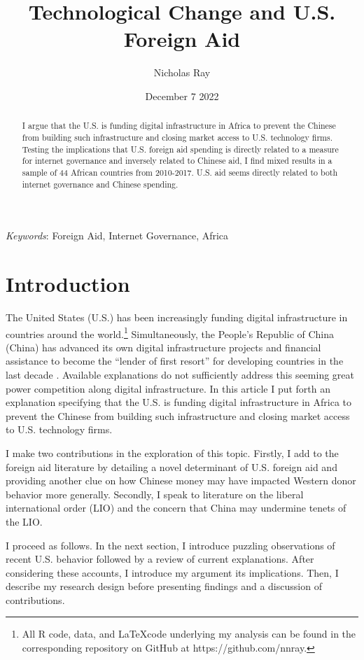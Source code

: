 \documentclass[12pt]{article}
\title{\vspace{-2.75cm}Technological Change and U.S. Foreign Aid\vspace{-0.5cm}}
\author{Nicholas Ray}
\date{\vspace{-0.30cm}December 7 2022\vspace{-1cm}}
\begin{document}
\maketitle
\begin{abstract}
    I argue that the U.S. is funding digital infrastructure in Africa to prevent the Chinese from building such infrastructure and closing market access to U.S. technology firms. Testing the implications that U.S. foreign aid spending is directly related to a measure for internet governance and inversely related to Chinese aid, I find mixed results in a sample of 44 African countries from 2010-2017. U.S. aid seems directly related to both internet governance and Chinese spending.
\end{abstract}

\textit{Keywords}: Foreign Aid, Internet Governance, Africa

\section*{Introduction}
The United States (U.S.) has been increasingly funding digital infrastructure in countries around the world.\footnote{All R code, data, and \LaTeX \;code underlying my analysis can be found in the corresponding repository on GitHub at https://github.com/nnray.} Simultaneously, the People's Republic of China (China) has advanced its own digital infrastructure projects and financial assistance to become the ``lender of first resort'' for developing countries in the last decade \parencite[1]{dreher2022}. Available explanations do not sufficiently address this seeming great power competition along digital infrastructure. In this article I put forth an explanation specifying that the U.S. is funding digital infrastructure in Africa to prevent the Chinese from building such infrastructure and closing market access to U.S. technology firms.

I make two contributions in the exploration of this topic. Firstly, I add to the foreign aid literature by detailing a novel determinant of U.S. foreign aid and providing another clue on how Chinese money may have impacted Western donor behavior more generally. Secondly, I speak to literature on the liberal international order (LIO) and the concern that China may undermine tenets of the LIO. %

I proceed as follows. In the next section, I introduce puzzling observations of recent U.S. behavior followed by a review of current explanations. After considering these accounts, I introduce my argument its implications. Then, I describe my research design before presenting findings and a discussion of contributions.
\end{document}
